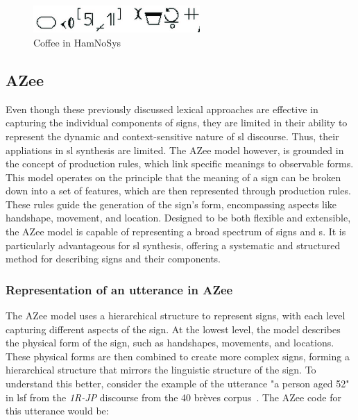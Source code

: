 \documentclass[../../main.tex]{subfiles}
\begin{document}
\begin{figure}
  \centering \includegraphics[width = 2.5in]{chapters/background_work/images/hamnosys_coffee.png}
  \caption{Coffee in HamNoSys}
  \label{fig:hamnosys_coffee}
\end{figure}

\subsection{AZee}
\label{ch:background_work:sign_language_descriptions:azee}

Even though these previously discussed lexical approaches are effective in capturing the individual components of signs, they are limited in their ability to represent the dynamic and context-sensitive nature of \gls{sl} discourse. Thus, their appliations in \gls{sl} synthesis are limited. The AZee model however, is grounded in the concept of production rules, which link specific meanings to observable forms. This model operates on the principle that the meaning of a sign can be broken down into a set of features, which are then represented through production rules. These rules guide the generation of the sign's form, encompassing aspects like handshape, movement, and location. Designed to be both flexible and extensible, the AZee model is capable of representing a broad spectrum of signs and s. It is particularly advantageous for \gls{sl} synthesis, offering a systematic and structured method for describing signs and their components.

\subsubsection{Representation of an \gls{utterance} in AZee}
\label{ch:background_work:sign_language_descriptions:azee:representation}

The AZee model uses a hierarchical structure to represent signs, with each level capturing different aspects of the sign. At the lowest level, the model describes the physical form of the sign, such as handshapes, movements, and locations. These physical forms are then combined to create more complex signs, forming a hierarchical structure that mirrors the linguistic structure of the sign. To understand this better, consider the example of the \gls{utterance} "a person aged 52" in \gls{lsf} from the \emph{1R-JP} discourse from the 40 brèves corpus~\cite{challant2022first}. The AZee code for this \gls{utterance} would be:
\end{document}

